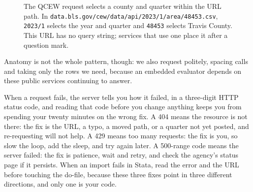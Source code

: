 \documentclass[
    a4paper,
    fontsize=10pt,
    twoside=true,
    numbers=noenddot,
]{kaobook}
\begin{document}
\begin{figure}[htbp]
\centering
{}
\caption[Anatomy of an API request]{The QCEW request selects a county and quarter within the URL path. In \texttt{data.bls.gov/cew/data/api/2023/1/area/48453.csv}, \texttt{2023/1} selects the year and quarter and \texttt{48453} selects Travis County. This URL has no query string; services that use one place it after a question mark.}
\label{fig:ch03-viz-anatomy}
\end{figure}

Anatomy is not the whole pattern, though: we also request politely, spacing calls and taking only the rows we need, because an embedded evaluator depends on these public services continuing to answer.

When a request fails, the server tells you how it failed, in a three-digit HTTP status code, and reading that code before you change anything keeps you from spending your twenty minutes on the wrong fix. A 404 means the resource is not there: the fix is the URL, a typo, a moved path, or a quarter not yet posted, and re-requesting will not help. A 429 means too many requests: the fix is you, so slow the loop, add the sleep, and try again later. A 500-range code means the server failed: the fix is patience, wait and retry, and check the agency's status page if it persists. When an import fails in Stata, read the error and the URL before touching the do-file, because these three fixes point in three different directions, and only one is your code.
\end{document}
